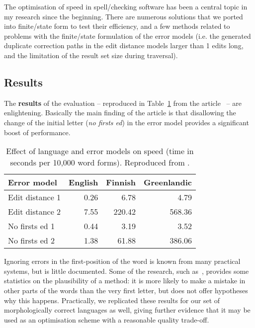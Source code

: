 \documentclass[officiallayout,final]{unihelcompling}
\begin{document}
The optimisation of speed in spell\-/checking software has been a central topic
in my research since the beginning. There are numerous solutions that we ported
into finite\-/state form to test their efficiency, and a few methods related to
problems with the finite\-/state formulation of the error models (i.e.  the
generated duplicate correction paths in the edit distance models larger than 1
edits long, and the limitation of the result set size during traversal).

\subsection{Results}

The \textbf{results} of the evaluation -- reproduced in
Table~\ref{table:fsmnlp-2012-repro} from the
article~ -- are enlightening. Basically the main
finding of the article is that disallowing the change of the initial letter
(\emph{no firsts ed}) in the error model provides a significant boost of
performance.

\begin{table}
    \centering
\begin{tabular}{|l|rrr|} \hline \bf Error model & \bf English & \bf Finnish &
    \bf Greenlandic \\ \hline 
    Edit distance 1 & 0.26 & 6.78   & 4.79 \\
    Edit distance 2 & 7.55 & 220.42 & 568.36 \\
No firsts ed 1      & 0.44 & 3.19   & 3.52 \\
No firsts ed 2      & 1.38 & 61.88  & 386.06 \\
\hline \end{tabular}

    \caption{Effect of language and error models on speed (time in seconds per 
        10,000 word forms). Reproduced from .
    \label{table:fsmnlp-2012-repro}}
\end{table}

Ignoring errors in the first-position of the word is known from many practical
systems, but is little documented. Some of the research, such
as~\citet{bhagat2007spelling}, provides some statistics on the plausibility of
a method: it is more likely to make a mistake in other parts of the words
than the very first letter, but does not offer hypotheses why this happens.
Practically, we replicated these results for our set of morphologically correct
languages as well, giving further evidence that it may be used as an
optimisation scheme with a reasonable quality trade-off.
\end{document}
